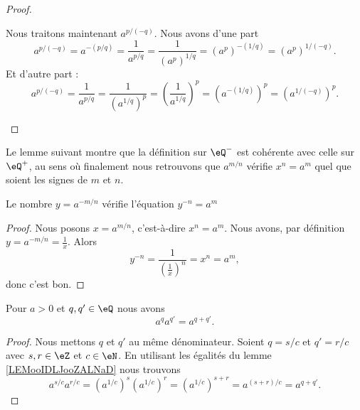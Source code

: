 \begin{proof}
\begin{subproof}

		Nous traitons maintenant \( a^{p/(-q)}\). Nous avons d'une part
		\begin{equation}
			a^{p/(-q)}=a^{-(p/q)}=\frac{1}{ a^{p/q} }=\frac{1}{ (a^p)^{1/q} }=(a^p)^{-(1/q)}=(a^p)^{1/(-q)}.
		\end{equation}
		Et d'autre part :
		\begin{equation}
			a^{p/(-q)}=\frac{1}{ a^{p/q} }=\frac{1}{ (a^{1/q})^p }=\left( \frac{1}{ a^{1/q} } \right)^p=\left( a^{-(1/q)} \right)^p=(a^{1/(-q)})^p.
		\end{equation}
	\end{subproof}
\end{proof}

Le lemme suivant montre que la définition sur \( \eQ^-\) est cohérente avec celle sur \( \eQ^+\), au sens où finalement nous retrouvons que \( a^{m/n}\) vérifie \( x^n=a^m \) quel que soient les signes de \( m\) et \( n\).
\begin{lemma}
	Le nombre \( y=a^{-m/n}\) vérifie l'équation \( y^{-n}=a^m\)
\end{lemma}

\begin{proof}
	Nous posons \( x=a^{m/n}\), c'est-à-dire \( x^n=a^m\). Nous avons, par définition \( y=a^{-m/n}=\frac{1}{ x }\). Alors
	\begin{equation}
		y^{-n}=\frac{1}{ \left( \frac{1}{ x } \right)^n }=x^n=a^m,
	\end{equation}
	donc c'est bon.
\end{proof}

\begin{lemma}        \label{LEMooJYGUooHhLASp}
	Pour \( a>0\) et \( q,q'\in \eQ\) nous avons
	\begin{equation}
		a^qa^{q'}=a^{q+q'}.
	\end{equation}
\end{lemma}

\begin{proof}
	Nous mettons \( q\) et \( q'\) au même dénominateur. Soient \( q=s/c\) et \( q'=r/c\) avec \( s,r\in \eZ\) et \( c\in \eN\). En utilisant les égalités du lemme \ref{LEMooIDLJooZALNaD} nous trouvons
	\begin{equation}
		a^{s/c}a^{r/c}=(a^{1/c})^s(a^{1/c})^r=(a^{1/c})^{s+r}=a^{(s+r)/c}=a^{q+q'}.
	\end{equation}
\end{proof}

